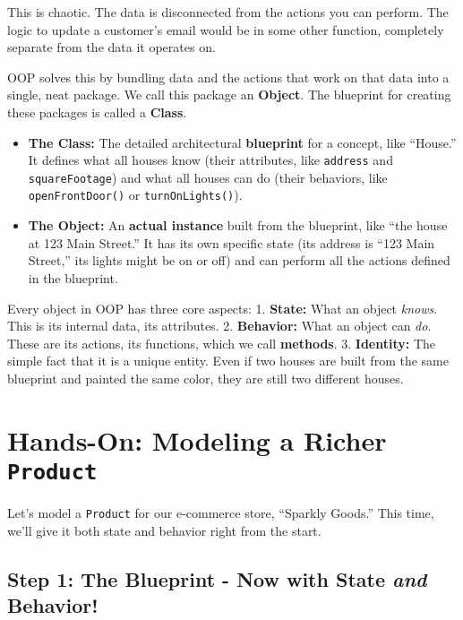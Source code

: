 \documentclass[
  letterpaper,
  DIV=11,
  numbers=noendperiod]{scrreprt}
\providecommand{\tightlist}{%
  \setlength{\itemsep}{0pt}\setlength{\parskip}{0pt}}
\begin{document}
This is chaotic. The data is disconnected from the actions you can
perform. The logic to update a customer's email would be in some other
function, completely separate from the data it operates on.

OOP solves this by bundling data and the actions that work on that data
into a single, neat package. We call this package an \textbf{Object}.
The blueprint for creating these packages is called a \textbf{Class}.

\begin{itemize}
\tightlist
\item
  \textbf{The Class:} The detailed architectural \textbf{blueprint} for
  a concept, like ``House.'' It defines what all houses know (their
  attributes, like \texttt{address} and \texttt{squareFootage}) and what
  all houses can do (their behaviors, like \texttt{openFrontDoor()} or
  \texttt{turnOnLights()}).
\item
  \textbf{The Object:} An \textbf{actual instance} built from the
  blueprint, like ``the house at 123 Main Street.'' It has its own
  specific state (its address is ``123 Main Street,'' its lights might
  be on or off) and can perform all the actions defined in the
  blueprint.
\end{itemize}

Every object in OOP has three core aspects: 1. \textbf{State:} What an
object \emph{knows}. This is its internal data, its attributes. 2.
\textbf{Behavior:} What an object can \emph{do}. These are its actions,
its functions, which we call \textbf{methods}. 3. \textbf{Identity:} The
simple fact that it is a unique entity. Even if two houses are built
from the same blueprint and painted the same color, they are still two
different houses.

\section{\texorpdfstring{Hands-On: Modeling a Richer
\texttt{Product}}{Hands-On: Modeling a Richer Product}}\label{hands-on-modeling-a-richer-product}

Let's model a \texttt{Product} for our e-commerce store, ``Sparkly
Goods.'' This time, we'll give it both state and behavior right from the
start.

\subsection{\texorpdfstring{Step 1: The Blueprint - Now with State
\emph{and}
Behavior!}{Step 1: The Blueprint - Now with State and Behavior!}}\label{step-1-the-blueprint---now-with-state-and-behavior}
\end{document}

